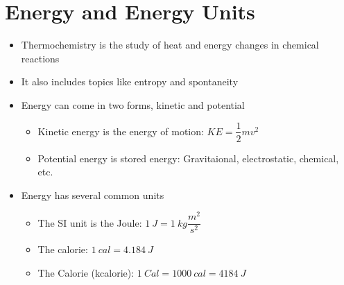 \documentclass[12pt, openany, letterpaper]{memoir}
\begin{document}
\section{Energy and Energy Units}
\begin{itemize}
	\item Thermochemistry is the study of heat and energy changes in chemical reactions
	\item It also includes topics like entropy and spontaneity
	\item Energy can come in two forms, kinetic and potential
	      \begin{itemize}
		      \item Kinetic energy is the energy of motion: $KE=\dfrac{1}{2}mv^2$
		      \item Potential energy is stored energy: Gravitaional, electrostatic, chemical, etc.
	      \end{itemize}
	\item Energy has several common units
	      \begin{itemize}
		      \item The SI unit is the Joule: $1~J=1~kg\dfrac{m^2}{s^2}$
		      \item The calorie: $1~cal=4.184~J$
		      \item The Calorie (kcalorie): $1~Cal=1000~cal=4184~J$
	      \end{itemize}
\end{itemize}
\end{document}
